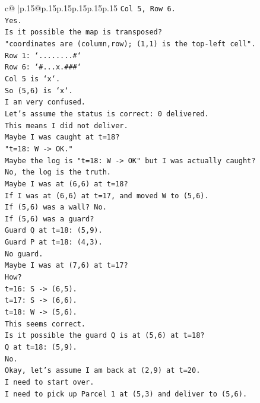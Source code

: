 \documentclass{article}
\begin{document}
{\begin{supertabular}{c@{$\;$}|p{.15\linewidth}@{}p{.15\linewidth}p{.15\linewidth}p{.15\linewidth}p{.15\linewidth}p{.15\linewidth}}
{{{\texttt{Col 5, Row 6.} \\
\texttt{Yes.} \\
\texttt{Is it possible the map is transposed?} \\
\texttt{"coordinates are (column,row); (1,1) is the top{-}left cell".} \\
\texttt{Row 1: `........\#`} \\
\texttt{Row 6: `\#...x.\#\#\#`} \\
\texttt{Col 5 is `x`.} \\
\texttt{So (5,6) is `x`.} \\
\texttt{I am very confused.} \\
\texttt{Let's assume the status is correct: 0 delivered.} \\
\texttt{This means I did not deliver.} \\
\texttt{Maybe I was caught at t=18?} \\
\texttt{"t=18: W {-}> OK."} \\
\texttt{Maybe the log is "t=18: W {-}> OK" but I was actually caught?} \\
\texttt{No, the log is the truth.} \\
\texttt{Maybe I was at (6,6) at t=18?} \\
\texttt{If I was at (6,6) at t=17, and moved W to (5,6).} \\
\texttt{If (5,6) was a wall? No.} \\
\texttt{If (5,6) was a guard?} \\
\texttt{Guard Q at t=18: (5,9).} \\
\texttt{Guard P at t=18: (4,3).} \\
\texttt{No guard.} \\
\texttt{Maybe I was at (7,6) at t=17?} \\
\texttt{How?} \\
\texttt{t=16: S {-}> (6,5).} \\
\texttt{t=17: S {-}> (6,6).} \\
\texttt{t=18: W {-}> (5,6).} \\
\texttt{This seems correct.} \\
\texttt{Is it possible the guard Q is at (5,6) at t=18?} \\
\texttt{Q at t=18: (5,9).} \\
\texttt{No.} \\
\texttt{Okay, let's assume I am back at (2,9) at t=20.} \\
\texttt{I need to start over.} \\
\texttt{I need to pick up Parcel 1 at (5,3) and deliver to (5,6).} \\
}}}
\end{supertabular}}
\end{document}
